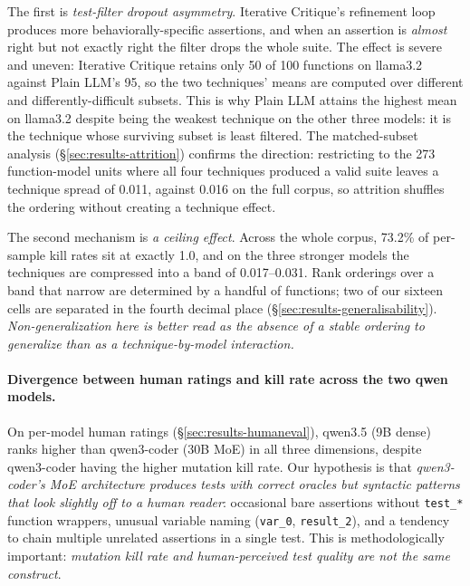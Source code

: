 \documentclass[smallextended]{svjour3}
\begin{document}
The first is \emph{test-filter dropout asymmetry}. Iterative
Critique's refinement loop produces more behaviorally-specific
assertions, and when an assertion is \emph{almost} right but not
exactly right the filter drops the whole suite. The effect is
severe and uneven: Iterative Critique retains only 50 of 100
functions on llama3.2 against Plain LLM's 95, so the two techniques'
means are computed over different and differently-difficult
subsets. This is why Plain LLM attains the highest mean on
llama3.2 despite being the weakest technique on the other three
models: it is the technique whose surviving subset is least filtered.
The matched-subset analysis (\S\ref{sec:results-attrition})
confirms the direction: restricting to the 273 function-model
units where all four techniques produced a valid suite leaves a technique
spread of 0.011, against 0.016 on the full corpus, so attrition
shuffles the ordering without creating a technique effect.

The second mechanism is \emph{a ceiling effect}. Across the whole
corpus, 73.2\% of per-sample kill rates sit at exactly 1.0, and on
the three stronger models the techniques are compressed into a band of
0.017--0.031. Rank orderings over a band that narrow are determined
by a handful of functions; two of our sixteen cells are separated
in the fourth decimal place
(\S\ref{sec:results-generalisability}). \emph{Non-generalization
here is better read as the absence of a stable ordering to
generalize than as a technique-by-model interaction.}

\paragraph{Divergence between human ratings and kill rate across the two qwen models.}
\label{sec:discussion-moe}

On per-model human ratings (\S\ref{sec:results-humaneval}),
qwen3.5 (9B dense) ranks higher than qwen3-coder (30B MoE) in all
three dimensions, despite qwen3-coder having the higher mutation
kill rate. Our hypothesis is that \emph{qwen3-coder's MoE
architecture produces tests with correct oracles but syntactic
patterns that look slightly off to a human reader}: occasional
bare assertions without \texttt{test\_*} function wrappers,
unusual variable naming (\texttt{var\_0}, \texttt{result\_2}), and
a tendency to chain multiple unrelated assertions in a single test.
This is methodologically important: \emph{mutation kill rate and
human-perceived test quality are not the same construct}.
\end{document}
